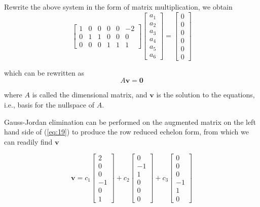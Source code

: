 \documentclass{article}
\begin{document}
Rewrite the above system in the form of matrix multiplication, we obtain
\begin{equation} \label{eq:19}
\begin{bmatrix}
    1 & 0 & 0 & 0 & 0 & -2 \\
    0 & 1 & 1 & 0 & 0 & 0 \\
    0 & 0 & 0 & 1 & 1 & 1
\end{bmatrix}
\begin{bmatrix}
           a_1 \\ a_2 \\ a_3 \\ a_4 \\ a_5 \\ a_6
\end{bmatrix}
= \begin{bmatrix}
           0 \\ 0 \\ 0 \\ 0 \\ 0 \\ 0
           
\end{bmatrix}
\end{equation}

which can be rewritten as
\begin{equation} 
A\bm{v} = \bm{0} 
\end{equation}

where $A$ is called the dimensional matrix, and $\bm{v}$ is the solution to the equations, i.e., basis for the nullspace of $A$.

Gauss-Jordan elimination can be performed on the augmented matrix on the left hand side of (\ref{eq:19}) to produce the row reduced echelon form, from which we can readily find $\bm{v}$


\begin{equation} \label{eq:21}
\bm{v} = 
  	c_1\begin{bmatrix} 2 \\ 0 \\ 0 \\ -1 \\ 0 \\ 1 \end{bmatrix}
  	+ c_2\begin{bmatrix} 0 \\ -1 \\ 1 \\ 0 \\ 0 \\ 0 \end{bmatrix}
  	+ c_3\begin{bmatrix} 0 \\ 0 \\ 0 \\ -1 \\ 1 \\ 0 \end{bmatrix}
\end{equation}
\end{document}
